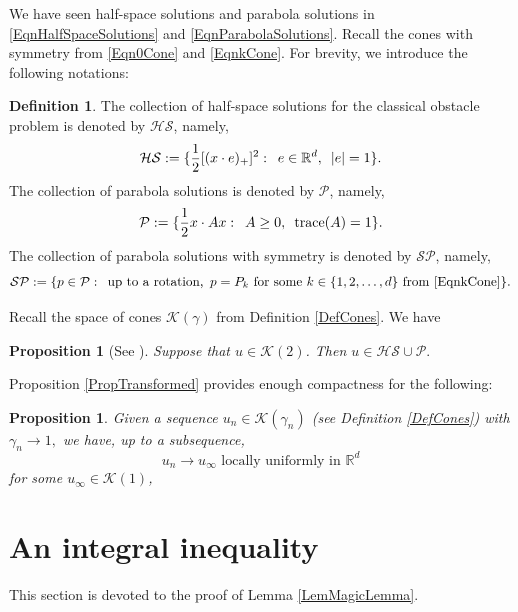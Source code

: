 \documentclass{amsart}
\def\R {\mathbb{R}}
\def\hem{\hspace{0.5em}}
\newtheorem{prop}[thm]{Proposition}
\theoremstyle{definition}
\newtheorem{defi}[thm]{Definition}
\numberwithin{equation}{section}
\theoremstyle{remark}
\begin{document}
We have seen  half-space solutions and parabola solutions in \eqref{EqnHalfSpaceSolutions} and \eqref{EqnParabolaSolutions}. Recall the cones with symmetry from \eqref{Eqn0Cone} and \eqref{EqnkCone}. For brevity, we introduce the following notations:
\begin{defi}
\label{DefObPCones}
The collection of half-space solutions for the classical obstacle problem is denoted by $\mathcal{HS}$, namely,
$$
\mathcal{HS}:=\{\frac12[(x\cdot e)_+]^2: \hem e\in\R^d, \hem |e|=1\}.
$$
The collection of parabola solutions is denoted by $\mathcal{P}$, namely,
$$
\mathcal{P}:=\{\frac12x\cdot Ax:\hem A\ge0,\hem \mathrm{trace}(A)=1\}.
$$
The collection of parabola solutions with symmetry is denoted by $\mathcal{SP}$, namely,
$$
\mathcal{SP}:=\{p\in\mathcal{P}: \hem \text{up to a rotation,}\hem p=P_k \text{ for some }k\in\{1,2,\dots,d\} \text{ from }\eqref{EqnkCone}\}.
$$
\end{defi}


Recall the space of cones $\mathcal{K}(\gamma)$ from Definition \ref{DefCones}. We have
\begin{prop}[See \cite{C, PSU}]
\label{PropObPCones}
Suppose that $u\in\mathcal{K}(2)$. Then 
$
u\in\mathcal{HS}\cup\mathcal{P}.
$
\end{prop} 

Proposition \ref{PropTransformed} provides enough compactness for the following:
\begin{prop}
\label{PropCompactness}
Given a sequence $u_n\in\mathcal{K}(\gamma_n)$ (see Definition \ref{DefCones}) with $\gamma_n\to1,$ we have, up to a subsequence, 
$$
u_n\to u_\infty \text{ locally uniformly in }\R^d
$$
for some $u_\infty\in\mathcal{K}(1)$,
\end{prop}
\section{An integral inequality}
\label{SectionInequality}

This section is devoted to the proof of  Lemma \ref{LemMagicLemma}.
\end{document}
